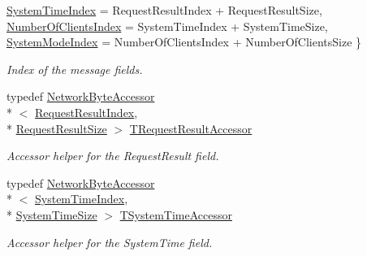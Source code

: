 \begin{DoxyCompactItemize}
\hyperlink{class_terra_swarm_1_1_synchronous_1_1_client_connection_response_a4cbf4ea0e840420400a931390a8acfbda2a8e1ab11473138d8b95056ea19323ac}{System\-Time\-Index} = Request\-Result\-Index + Request\-Result\-Size, 
\hyperlink{class_terra_swarm_1_1_synchronous_1_1_client_connection_response_a4cbf4ea0e840420400a931390a8acfbdacfa0a3412da8705ea266357cfda4b3e5}{Number\-Of\-Clients\-Index} = System\-Time\-Index + System\-Time\-Size, 
\hyperlink{class_terra_swarm_1_1_synchronous_1_1_client_connection_response_a4cbf4ea0e840420400a931390a8acfbda0554d9a00a3e896e87549ad13eafa1ed}{System\-Mode\-Index} = Number\-Of\-Clients\-Index + Number\-Of\-Clients\-Size
 \}
\begin{DoxyCompactList}\small\item\em Index of the message fields. \end{DoxyCompactList}\item 
typedef \hyperlink{class_terra_swarm_1_1_network_byte_accessor}{Network\-Byte\-Accessor}\\*
$<$ \hyperlink{class_terra_swarm_1_1_synchronous_1_1_client_connection_response_a4cbf4ea0e840420400a931390a8acfbda71c63341170df807c76e11e47c8cb62e}{Request\-Result\-Index}, \\*
\hyperlink{class_terra_swarm_1_1_synchronous_1_1_client_connection_response_a3933c56d09c6ccf4f1b533024d9d4b08aec725d8333b75b6c1cf36a1703d8712f}{Request\-Result\-Size} $>$ \hyperlink{class_terra_swarm_1_1_synchronous_1_1_client_connection_response_af1c0b39e843f05dcadd4e2b39c65bcee}{T\-Request\-Result\-Accessor}
\begin{DoxyCompactList}\small\item\em Accessor helper for the Request\-Result field. \end{DoxyCompactList}\item 
typedef \hyperlink{class_terra_swarm_1_1_network_byte_accessor}{Network\-Byte\-Accessor}\\*
$<$ \hyperlink{class_terra_swarm_1_1_synchronous_1_1_client_connection_response_a4cbf4ea0e840420400a931390a8acfbda2a8e1ab11473138d8b95056ea19323ac}{System\-Time\-Index}, \\*
\hyperlink{class_terra_swarm_1_1_synchronous_1_1_client_connection_response_a3933c56d09c6ccf4f1b533024d9d4b08ace1096317246657c7174cc95e7ae42fd}{System\-Time\-Size} $>$ \hyperlink{class_terra_swarm_1_1_synchronous_1_1_client_connection_response_ad4b8d0ca4f4c2bbb9cfc704e6b250e57}{T\-System\-Time\-Accessor}
\begin{DoxyCompactList}\small\item\em Accessor helper for the System\-Time field. \end{DoxyCompactList}\item 

\end{DoxyCompactItemize}
